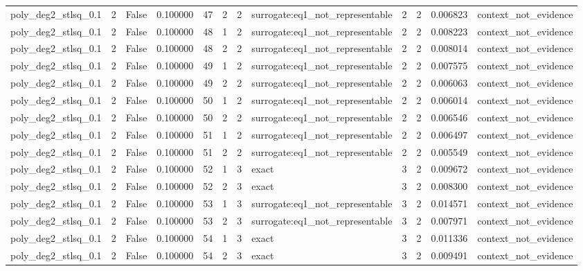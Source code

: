 \begin{tabular}{lrrrrrrlrrrl}
poly\_deg2\_stlsq\_0.1 & 2 & False & 0.100000 & 47 & 2 & 2 & surrogate:eq1\_not\_representable & 2 & 2 & 0.006823 & context\_not\_evidence \\
poly\_deg2\_stlsq\_0.1 & 2 & False & 0.100000 & 48 & 1 & 2 & surrogate:eq1\_not\_representable & 2 & 2 & 0.008223 & context\_not\_evidence \\
poly\_deg2\_stlsq\_0.1 & 2 & False & 0.100000 & 48 & 2 & 2 & surrogate:eq1\_not\_representable & 2 & 2 & 0.008014 & context\_not\_evidence \\
poly\_deg2\_stlsq\_0.1 & 2 & False & 0.100000 & 49 & 1 & 2 & surrogate:eq1\_not\_representable & 2 & 2 & 0.007575 & context\_not\_evidence \\
poly\_deg2\_stlsq\_0.1 & 2 & False & 0.100000 & 49 & 2 & 2 & surrogate:eq1\_not\_representable & 2 & 2 & 0.006063 & context\_not\_evidence \\
poly\_deg2\_stlsq\_0.1 & 2 & False & 0.100000 & 50 & 1 & 2 & surrogate:eq1\_not\_representable & 2 & 2 & 0.006014 & context\_not\_evidence \\
poly\_deg2\_stlsq\_0.1 & 2 & False & 0.100000 & 50 & 2 & 2 & surrogate:eq1\_not\_representable & 2 & 2 & 0.006546 & context\_not\_evidence \\
poly\_deg2\_stlsq\_0.1 & 2 & False & 0.100000 & 51 & 1 & 2 & surrogate:eq1\_not\_representable & 2 & 2 & 0.006497 & context\_not\_evidence \\
poly\_deg2\_stlsq\_0.1 & 2 & False & 0.100000 & 51 & 2 & 2 & surrogate:eq1\_not\_representable & 2 & 2 & 0.005549 & context\_not\_evidence \\
poly\_deg2\_stlsq\_0.1 & 2 & False & 0.100000 & 52 & 1 & 3 & exact & 3 & 2 & 0.009672 & context\_not\_evidence \\
poly\_deg2\_stlsq\_0.1 & 2 & False & 0.100000 & 52 & 2 & 3 & exact & 3 & 2 & 0.008300 & context\_not\_evidence \\
poly\_deg2\_stlsq\_0.1 & 2 & False & 0.100000 & 53 & 1 & 3 & surrogate:eq1\_not\_representable & 3 & 2 & 0.014571 & context\_not\_evidence \\
poly\_deg2\_stlsq\_0.1 & 2 & False & 0.100000 & 53 & 2 & 3 & surrogate:eq1\_not\_representable & 3 & 2 & 0.007971 & context\_not\_evidence \\
poly\_deg2\_stlsq\_0.1 & 2 & False & 0.100000 & 54 & 1 & 3 & exact & 3 & 2 & 0.011336 & context\_not\_evidence \\
poly\_deg2\_stlsq\_0.1 & 2 & False & 0.100000 & 54 & 2 & 3 & exact & 3 & 2 & 0.009491 & context\_not\_evidence \\

\end{tabular}
